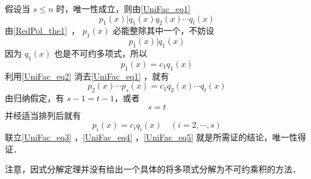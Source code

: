  假设当 $s\leq n$ 时，唯一性成立，则由\autoref{UniFac_eq1} 
 \begin{equation}
 p_1(x)|q_1(x)q_2(x)\cdots q_t(x)
 \end{equation}
 由\autoref{RedPol_the1}~， $p_1(x)$ 必能整除其中一个，不妨设
 \begin{equation}
 p_1(x)|q_1(x)
 \end{equation}
 因为 $q_1(x)$ 也是不可约多项式，所以
 \begin{equation}\label{UniFac_eq2}
 p_1(x)=c_1q_1(x)
 \end{equation}
 利用\autoref{UniFac_eq2} 消去\autoref{UniFac_eq1} ，就有
 \begin{equation}\label{UniFac_eq3}
 p_2(x)\cdots p_s(x)=c_1q_2(x)\cdots q_t(x)
 \end{equation}
 由归纳假定，有 $s-1=t-1$，或者
 \begin{equation}\label{UniFac_eq4}
 s=t
 \end{equation}
 并经适当排列后就有
 \begin{equation}\label{UniFac_eq5}
 p_i(x)=c_iq_i(x)\quad (i=2,\cdots,s)
 \end{equation}
 联立\autoref{UniFac_eq3} ，\autoref{UniFac_eq4} ，\autoref{UniFac_eq5} 就是所需证的结论，唯一性得证．

注意，因式分解定理并没有给出一个具体的将多项式分解为不可约乘积的方法．